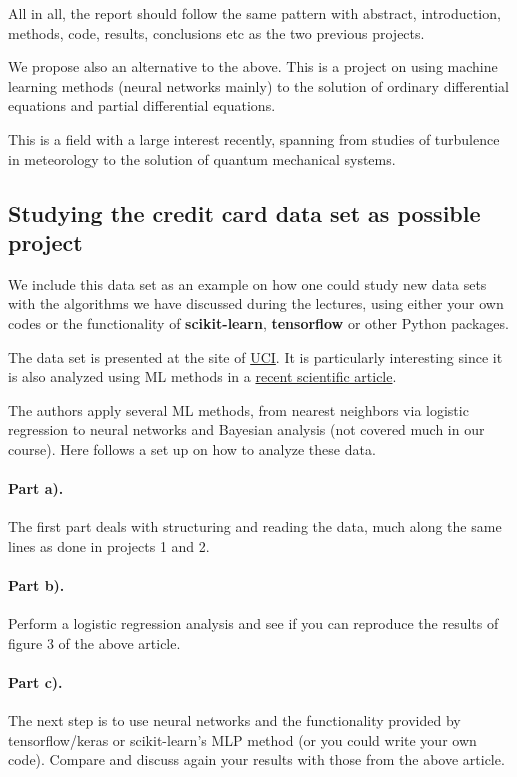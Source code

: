 \documentclass[%
oneside,                 %
final,                   %
10pt]{article}
\begin{document}
\noindent
All in all, the report should follow the same pattern with abstract, introduction, methods, code, results, conclusions etc as the two previous projects. 

We propose also an alternative to the above. This is a project on using machine learning methods (neural networks mainly) to the solution of ordinary differential equations and partial differential equations. 

This is a field with a large interest recently, spanning from studies of turbulence in meteorology to the solution of quantum mechanical systems. 

\subsection{Studying the credit card data set as possible project}

We include this data set as an example on how one could study new data sets with the algorithms we have discussed during the lectures, using either your own codes or the functionality of \textbf{scikit-learn}, \textbf{tensorflow} or other Python packages.

The data set is presented at the site of  \href{{https://archive.ics.uci.edu/ml/datasets/default+of+credit+card+clients}}{UCI}. It is particularly interesting since it is also analyzed using ML methods in a \href{{https://bradzzz.gitbooks.io/ga-seattle-dsi/content/dsi/dsi_05_classification_databases/2.1-lesson/assets/datasets/DefaultCreditCardClients_yeh_2009.pdf}}{recent scientific article}.  

The authors apply several ML methods, from nearest neighbors via logistic regression to neural networks and Bayesian analysis (not covered much in our course).
Here follows a set up on how to analyze these data.

\paragraph{Part a).}
The first part deals with structuring and reading the data, much along the same lines as done in projects 1 and 2. 

\paragraph{Part b).}
Perform a logistic regression analysis and see if you can reproduce the results of figure 3 of the above article. 

\paragraph{Part c).}
The next step is to use neural networks and the  functionality provided by tensorflow/keras or scikit-learn's MLP method (or you could write your own code). Compare and discuss again your results with those from the above article.
\end{document}
